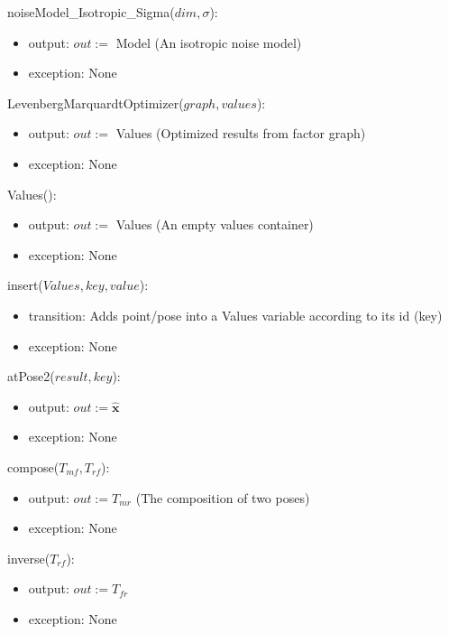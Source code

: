 \documentclass[12pt, titlepage]{article}
\begin{document}
\noindent noiseModel\_Isotropic\_Sigma($dim, \sigma$):
\begin{itemize}
    \item output: $out:=$ Model (An isotropic noise model)
    \item exception: None
\end{itemize}

\noindent LevenbergMarquardtOptimizer($graph, values$):
\begin{itemize}
    \item output: $out:=$ Values (Optimized results from factor graph)
    \item exception: None
\end{itemize}

\noindent Values():
\begin{itemize}
    \item output: $out:=$ Values (An empty values container)
    \item exception: None
\end{itemize}

\noindent insert($Values, key, value$):
\begin{itemize}
    \item transition: Adds point/pose into a Values variable according to its id (key)
    \item exception: None
\end{itemize}

\noindent atPose2($result, key$):
\begin{itemize}
    \item output: $out:= \mathbf{\hat{x}}$ 
    \item exception: None
\end{itemize}

\noindent compose($T_{mf}, T_{rf}$):
\begin{itemize}
    \item output: $out:= T_{mr}$ (The composition of two poses)
    \item exception: None
\end{itemize}

\noindent inverse($T_{rf}$):
\begin{itemize}
    \item output: $out:= T_{fr}$
    \item exception: None
\end{itemize}

\end{document}
